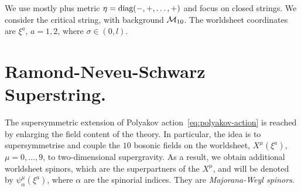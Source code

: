 
We use mostly plus metric $\eta = \textup{diag}(-, +, \dots, +)$ and focus on closed strings. We consider the critical string, with background $\mathcal{M}_{10}$. The worldsheet coordinates are $\xi^a$, $a = 1,2$, where $\sigma \in (0,l)$.

\section{Ramond-Neveu-Schwarz Superstring.}
The supersymmetric extension of Polyakov action~\eqref{eq:polyakov-action} is reached by enlarging the field content of the theory. In particular, the idea is to supersymmetrise and couple the $10$ bosonic fields on the worldsheet, $X^\mu (\xi^a)$, $\mu = 0, \dots, 9$, to two-dimensional supergravity. As a result, we obtain additional worldsheet spinors, which are the superpartners of the $X^\mu$, and will be denoted by $\psi^\mu_\alpha (\xi^a)$, where $\alpha$ are the spinorial indices. They are \emph{Majorana-Weyl spinors}.

